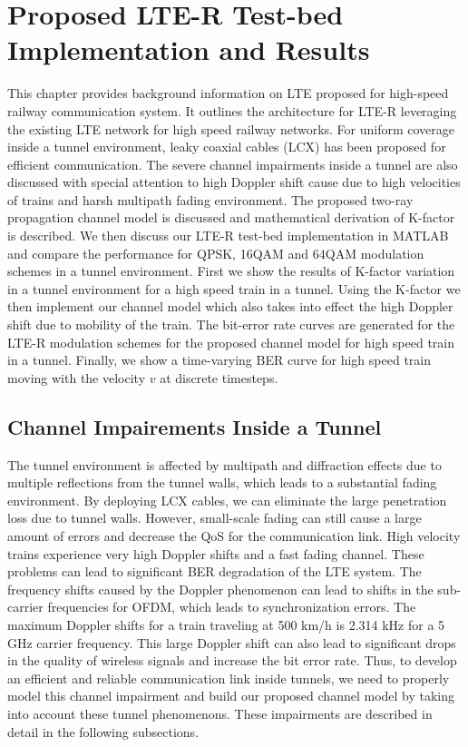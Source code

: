 \chapter{Proposed LTE-R Test-bed Implementation and Results}
\label{chapter4}

This chapter provides background information on LTE proposed for high-speed railway communication system. It outlines the architecture for LTE-R leveraging the existing LTE network for high speed railway networks. For uniform coverage inside a tunnel environment, leaky coaxial cables (LCX) has been proposed for efficient communication. The severe channel impairments inside a tunnel are also discussed with special attention to high Doppler shift cause due to high velocities of trains and harsh multipath fading environment. The proposed two-ray propagation channel model is discussed and mathematical derivation of K-factor is described. We then discuss our LTE-R test-bed implementation in MATLAB and compare the performance for QPSK, 16QAM and 64QAM modulation schemes in a tunnel environment. First we show the results of K-factor variation in a tunnel environment for a high speed train in a tunnel. Using the K-factor we then implement our channel model which also takes into effect the high Doppler shift due to mobility of the train. The bit-error rate curves are generated for the LTE-R modulation schemes for the proposed channel model for high speed train in a tunnel. Finally, we show a time-varying BER curve for high speed train moving with the velocity $v$ at discrete timesteps.


\section{Channel Impairements Inside a Tunnel}
The tunnel environment is affected by multipath and diffraction effects due to multiple reflections from the tunnel walls, which leads to a substantial fading environment. By deploying LCX cables, we can eliminate the large penetration loss due to tunnel walls. However, small-scale fading can still cause a large amount of errors and decrease the QoS for the communication link. High velocity trains experience very high Doppler shifts and a fast fading channel. These problems can lead to significant BER degradation of the LTE system. The frequency shifts caused by the Doppler phenomenon can lead to shifts in the sub-carrier frequencies for OFDM, which leads to synchronization errors. The maximum Doppler shifts for a train traveling at 500 km/h is 2.314 kHz for a 5 GHz carrier frequency. This large Doppler shift can also lead to significant drops in the quality of wireless signals and increase the bit error rate. Thus,
to develop an efficient and reliable communication link inside tunnels, we need to properly model this channel impairment and build our proposed channel model by taking into account these tunnel phenomenons. These impairments are described in detail in the following subsections.

